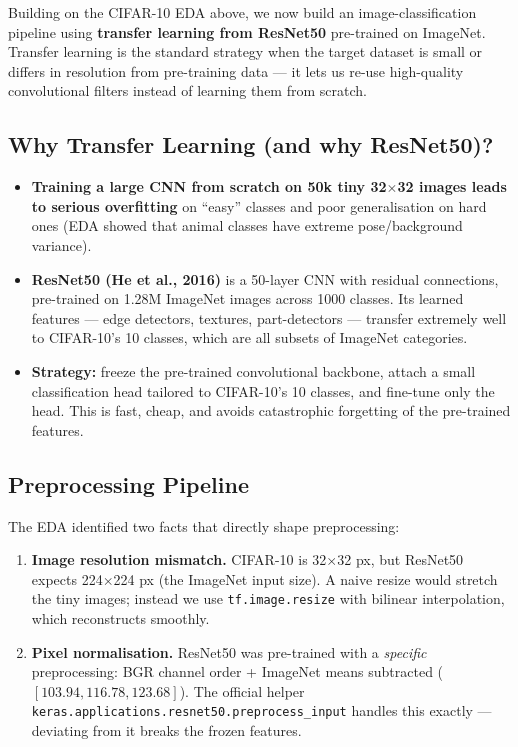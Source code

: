 \label{sec:a2_image}

Building on the CIFAR-10 EDA above, we now build an image-classification pipeline using \textbf{transfer learning from ResNet50} pre-trained on ImageNet. Transfer learning is the standard strategy when the target dataset is small or differs in resolution from pre-training data --- it lets us re-use high-quality convolutional filters instead of learning them from scratch.

\subsection{Why Transfer Learning (and why ResNet50)?}

\begin{itemize}
    \item \textbf{Training a large CNN from scratch on 50k tiny 32$\times$32 images leads to serious overfitting} on ``easy'' classes and poor generalisation on hard ones (EDA showed that animal classes have extreme pose/background variance).
    \item \textbf{ResNet50 (He et al., 2016)} is a 50-layer CNN with residual connections, pre-trained on 1.28M ImageNet images across 1000 classes. Its learned features --- edge detectors, textures, part-detectors --- transfer extremely well to CIFAR-10's 10 classes, which are all subsets of ImageNet categories.
    \item \textbf{Strategy:} freeze the pre-trained convolutional backbone, attach a small classification head tailored to CIFAR-10's 10 classes, and fine-tune only the head. This is fast, cheap, and avoids catastrophic forgetting of the pre-trained features.
\end{itemize}

\subsection{Preprocessing Pipeline}

The EDA identified two facts that directly shape preprocessing:

\begin{enumerate}
    \item \textbf{Image resolution mismatch.} CIFAR-10 is 32$\times$32 px, but ResNet50 expects 224$\times$224 px (the ImageNet input size). A naive resize would stretch the tiny images; instead we use \texttt{tf.image.resize} with bilinear interpolation, which reconstructs smoothly.
    \item \textbf{Pixel normalisation.} ResNet50 was pre-trained with a \emph{specific} preprocessing: BGR channel order + ImageNet means subtracted ($[103.94, 116.78, 123.68]$). The official helper \texttt{keras.applications.resnet50.preprocess\_input} handles this exactly --- deviating from it breaks the frozen features.
\end{enumerate}

